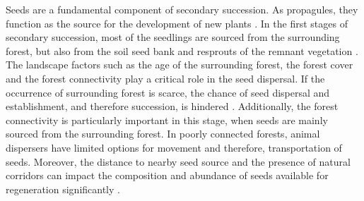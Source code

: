 Seeds are a fundamental component of secondary succession. As propagules, they function as the source for the development of new plants \citep{poorterSuccessionalTheories2023}. In the first stages of secondary succession, most of the seedlings are sourced from the surrounding forest, but also from the soil seed bank and resprouts of the remnant vegetation \citep{huancanunezSeedrainsuccessionalFeedbacksWet2021}. The landscape factors such as the age of the surrounding forest, the forest cover and the forest connectivity play a critical role in the seed dispersal. If the occurrence of surrounding forest is scarce, the chance of seed dispersal and establishment, and therefore succession, is hindered \citep{hordijkLandUseHistory2024}. Additionally, the forest connectivity is particularly important in this stage, when seeds are mainly sourced from the surrounding forest. In poorly connected forests, animal dispersers have limited options for movement and therefore, transportation of seeds.  Moreover, the distance to nearby seed source and the presence of natural corridors can impact the composition and abundance of seeds available for regeneration significantly \citep{dentUnitingNicheDifferentiation2021, arroyo-rodriguezMultipleSuccessionalPathways2017}.





